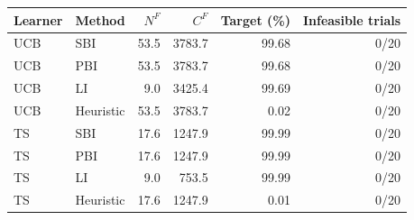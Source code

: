 \begin{tabular}{llrrrr}
\toprule
Learner & Method & $N^F$ & $C^F$ & Target (\%) & Infeasible trials \\
\midrule
UCB & SBI & 53.5 & 3783.7 & 99.68 & 0/20 \\
UCB & PBI & 53.5 & 3783.7 & 99.68 & 0/20 \\
UCB & LI & 9.0 & 3425.4 & 99.69 & 0/20 \\
UCB & Heuristic & 53.5 & 3783.7 & 0.02 & 0/20 \\
\midrule
TS & SBI & 17.6 & 1247.9 & 99.99 & 0/20 \\
TS & PBI & 17.6 & 1247.9 & 99.99 & 0/20 \\
TS & LI & 9.0 & 753.5 & 99.99 & 0/20 \\
TS & Heuristic & 17.6 & 1247.9 & 0.01 & 0/20 \\
\bottomrule
\end{tabular}
